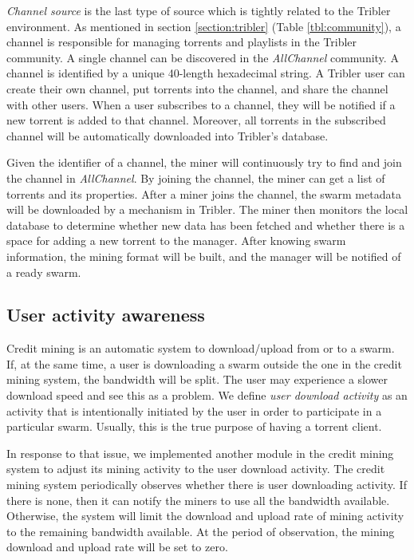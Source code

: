 \textit{Channel source} is the last type of source which is tightly related to the Tribler environment. As mentioned in section \ref{section:tribler} (Table \ref{tbl:community}), a channel is responsible for managing torrents and playlists in the Tribler community. A single channel can be discovered in the \textit{AllChannel} community. A channel is identified by a unique 40-length hexadecimal string. A Tribler user can create their own channel, put torrents into the channel, and share the channel with other users. When a user subscribes to a channel, they will be notified if a new torrent is added to that channel. Moreover, all torrents in the subscribed channel will be automatically downloaded into Tribler's database.

Given the identifier of a channel, the miner will continuously try to find and join the channel in \textit{AllChannel}. By joining the channel, the miner can get a list of torrents and its properties. After a miner joins the channel, the swarm metadata will be downloaded by a mechanism in Tribler. The miner then monitors the local database to determine whether new data has been fetched and whether there is a space for adding a new torrent to the manager. After knowing swarm information, the mining format will be built, and the manager will be notified of a ready swarm.

\subsection{User activity awareness}
\label{section:uactivityimpl}
Credit mining is an automatic system to download/upload from or to a swarm. If, at the same time, a user is downloading a swarm outside the one in the credit mining system, the bandwidth will be split. The user may experience a slower download speed and see this as a problem. We define \textit{user download activity} as an activity that is intentionally initiated by the user in order to participate in a particular swarm. Usually, this is the true purpose of having a torrent client. 

In response to that issue, we implemented another module in the credit mining system to adjust its mining activity to the user download activity. The credit mining system periodically observes whether there is user downloading activity. If there is none, then it can notify the miners to use all the bandwidth available. Otherwise, the system will limit the download and upload rate of mining activity to the remaining bandwidth available. At the period of observation, the mining download and upload rate will be set to zero.


